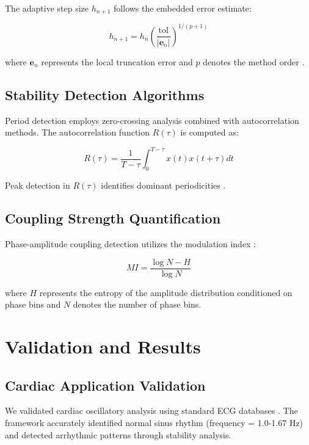 \documentclass[twocolumn]{article}
\begin{document}
The adaptive step size $h_{n+1}$ follows the embedded error estimate:

\begin{equation}
h_{n+1} = h_n \left(\frac{\text{tol}}{|\mathbf{e}_n|}\right)^{1/(p+1)}
\label{eq:adaptive_step}
\end{equation}

where $\mathbf{e}_n$ represents the local truncation error and $p$ denotes the method order \citep{hairer1993solving}.

\subsection{Stability Detection Algorithms}

Period detection employs zero-crossing analysis combined with autocorrelation methods. The autocorrelation function $R(\tau)$ is computed as:

\begin{equation}
R(\tau) = \frac{1}{T-\tau} \int_0^{T-\tau} x(t)x(t+\tau) dt
\label{eq:autocorr}
\end{equation}

Peak detection in $R(\tau)$ identifies dominant periodicities \citep{bendat2010random}.

\subsection{Coupling Strength Quantification}

Phase-amplitude coupling detection utilizes the modulation index \citep{tort2010measuring}:

\begin{equation}
MI = \frac{\log N - H}{\log N}
\label{eq:modulation_index}
\end{equation}

where $H$ represents the entropy of the amplitude distribution conditioned on phase bins and $N$ denotes the number of phase bins.

\section{Validation and Results}

\subsection{Cardiac Application Validation}

We validated cardiac oscillatory analysis using standard ECG databases \citep{goldberger2000physiobank}. The framework accurately identified normal sinus rhythm (frequency = 1.0-1.67 Hz) and detected arrhythmic patterns through stability analysis.
\end{document}

